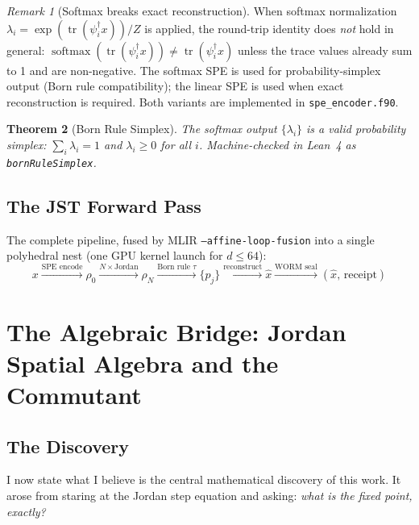 \documentclass[12pt, letterpaper]{article}
\theoremstyle{plain}
\newtheorem{theorem}{Theorem}[section]
\theoremstyle{definition}
\theoremstyle{remark}
\newtheorem{remark}[theorem]{Remark}
\begin{document}
\begin{remark}[Softmax breaks exact reconstruction]
When softmax normalization $\lambda_i = \exp(\operatorname{tr}(\psi_i^\dagger x))/Z$
is applied, the round-trip identity does \emph{not} hold in general:
$\operatorname{softmax}(\operatorname{tr}(\psi_i^\dagger x)) \neq \operatorname{tr}(\psi_i^\dagger x)$
unless the trace values already sum to 1 and are non-negative.
The softmax SPE is used for probability-simplex output (Born rule compatibility);
the linear SPE is used when exact reconstruction is required.
Both variants are implemented in \texttt{spe\_encoder.f90}.
\end{remark}

\begin{theorem}[Born Rule Simplex]
\label{thm:born_simplex}
The softmax output $\{\lambda_i\}$ is a valid probability simplex:
$\sum_i \lambda_i = 1$ and $\lambda_i \geq 0$ for all $i$.
Machine-checked in Lean~4 as \texttt{bornRuleSimplex}.
\end{theorem}

\subsection{The JST Forward Pass}

The complete pipeline, fused by MLIR \texttt{--affine-loop-fusion} into a single
polyhedral nest (one GPU kernel launch for $d \leq 64$):
\[
x
\xrightarrow{\text{SPE encode}}
\rho_0
\xrightarrow{N \times \text{Jordan}}
\rho_N
\xrightarrow{\text{Born rule } \tau}
\{p_j\}
\xrightarrow{\text{reconstruct}}
\hat{x}
\xrightarrow{\text{WORM seal}}
(\hat{x},\, \text{receipt})
\]

\section{The Algebraic Bridge: Jordan Spatial Algebra and the Commutant}
\label{sec:bridge}

\subsection{The Discovery}

I now state what I believe is the central mathematical discovery of this work.
It arose from staring at the Jordan step equation and asking: \textit{what is the
fixed point, exactly?}
\end{document}
